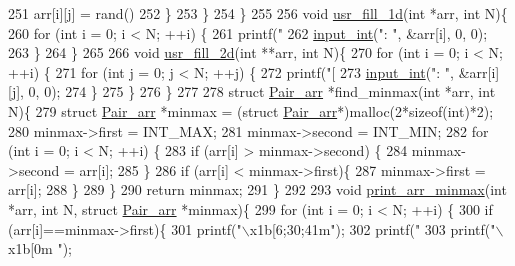 \begin{DoxyCodeInclude}
{{{{251             arr[i][j] = rand()%
252         \}
253     \}
254 \}
255 
256 \textcolor{keywordtype}{void} \hyperlink{main_8c_a754c278f22020e77d09cda28d2e18f4e}{usr\_fill\_1d}(\textcolor{keywordtype}{int} *arr, \textcolor{keywordtype}{int} N)\{
260     \textcolor{keywordflow}{for} (\textcolor{keywordtype}{int} i = 0; i < N; ++i) \{
261         printf(\textcolor{stringliteral}{"%
262         \hyperlink{main_8c_a6f453bc035d85e967bd5032eca31a155}{input\_int}(\textcolor{stringliteral}{": "}, &arr[i], 0, 0);
263     \}
264 \}
265 
266 \textcolor{keywordtype}{void} \hyperlink{main_8c_abfbfcf6cfc51d4db85271a06ec30e7d3}{usr\_fill\_2d}(\textcolor{keywordtype}{int} **arr, \textcolor{keywordtype}{int} N)\{
270     \textcolor{keywordflow}{for} (\textcolor{keywordtype}{int} i = 0; i < N; ++i) \{
271         \textcolor{keywordflow}{for} (\textcolor{keywordtype}{int} j = 0; j < N; ++j) \{
272             printf(\textcolor{stringliteral}{"[%
273             \hyperlink{main_8c_a6f453bc035d85e967bd5032eca31a155}{input\_int}(\textcolor{stringliteral}{": "}, &arr[i][j], 0, 0);
274         \}
275     \}
276 \}
277 
278 \textcolor{keyword}{struct }\hyperlink{structPair__arr}{Pair\_arr} *find\_minmax(\textcolor{keywordtype}{int} *arr, \textcolor{keywordtype}{int} N)\{
279     \textcolor{keyword}{struct }\hyperlink{structPair__arr}{Pair\_arr} *minmax = (\textcolor{keyword}{struct }\hyperlink{structPair__arr}{Pair\_arr}*)malloc(2*\textcolor{keyword}{sizeof}(\textcolor{keywordtype}{int})*2);
280     minmax->first = INT\_MAX;
281     minmax->second = INT\_MIN;
282     \textcolor{keywordflow}{for} (\textcolor{keywordtype}{int} i = 0; i < N; ++i) \{
283         \textcolor{keywordflow}{if} (arr[i] > minmax->second) \{
284             minmax->second = arr[i];
285         \}
286         \textcolor{keywordflow}{if} (arr[i] < minmax->first)\{
287             minmax->first = arr[i];
288         \}
289     \}
290     \textcolor{keywordflow}{return} minmax;
291 \}
292 
293 \textcolor{keywordtype}{void} \hyperlink{main_8c_a954f537fd937eb56b052549a1e3b4be4}{print\_arr\_minmax}(\textcolor{keywordtype}{int} *arr, \textcolor{keywordtype}{int} N, \textcolor{keyword}{struct} \hyperlink{structPair__arr}{Pair\_arr} *minmax)\{
299     \textcolor{keywordflow}{for} (\textcolor{keywordtype}{int} i = 0; i < N; ++i) \{
300         \textcolor{keywordflow}{if} (arr[i]==minmax->first)\{
301             printf(\textcolor{stringliteral}{"\(\backslash\)x1b[6;30;41m"});
302             printf(\textcolor{stringliteral}{"%
303             printf(\textcolor{stringliteral}{"\(\backslash\)x1b[0m "});
}}}}}}}
\end{DoxyCodeInclude}
